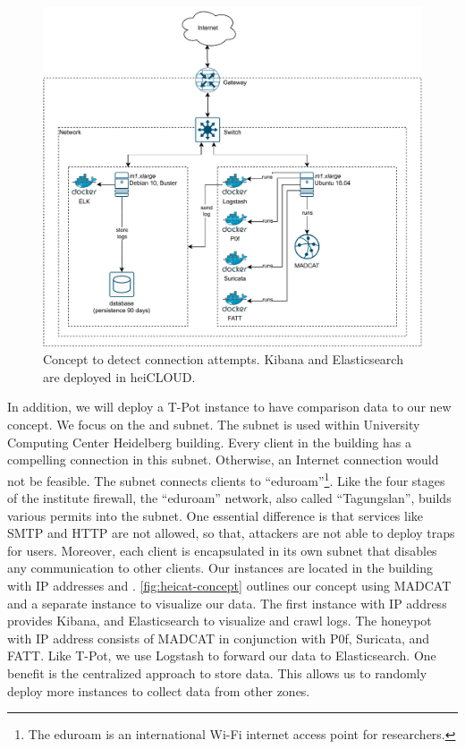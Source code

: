\begin{figure}
    \centering
    \includegraphics[width=\textwidth]{figures/heicat-concept.pdf}
    \caption[Concept to detect connection attempts]{
        Concept to detect connection attempts.
        Kibana and Elasticsearch are deployed in heiCLOUD.
    }
    \label{fig:heicat-concept}
\end{figure}

In addition, we will deploy a T-Pot instance to have comparison data to our new concept.
We focus on the  and  subnet.
The  subnet is used within University Computing Center Heidelberg building.
Every client in the building has a compelling connection in this subnet.
Otherwise, an Internet connection would not be feasible.
The subnet  connects clients to \enquote{eduroam}\footnote{The eduroam is an international Wi-Fi internet access point for researchers.}.
Like the four stages of the institute firewall, the \enquote{eduroam} network, also called \enquote{Tagungslan}, builds various permits into the subnet.
One essential difference is that services like SMTP and HTTP are not allowed, so that, attackers are not able to deploy traps for users.
Moreover, each client is encapsulated in its own subnet that disables any communication to other clients.
Our instances are located in the building with IP addresses  and .
\autoref{fig:heicat-concept} outlines our concept using MADCAT and a separate instance to visualize our data.
The first instance with IP address  provides Kibana, and Elasticsearch to visualize and crawl logs.
The honeypot with IP address  consists of MADCAT in conjunction with P0f, Suricata, and FATT.
Like T-Pot, we use Logstash to forward our data to Elasticsearch.
One benefit is the centralized approach to store data.
This allows us to randomly deploy more instances to collect data from other zones.


